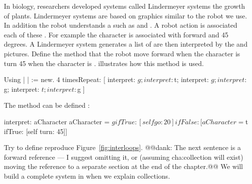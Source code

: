 {In  biology, researchers  developed systems called Lindermeyer systems  the growth of plants. Lindermeyer systems are based on  graphics similar to the robot we use. In addition  the robot understands a   such as  and . A robot action is associated  each of these . For example the character  is associated with  forward\add{,} and   45 degrees. A Lindermeyer system generates a list of  are then interpreted by the  and  pictures. \add{\paragraph
}
Define the method  that  the robot  move forward when the character is  turn 45  when the character is .  illustrates how this method is used.

\begin{scriptwithtitle}{Using }\label{src:interpret}
|  |
 := \Turtle new. 
4 timesRepeat: 
   [   
       interpret: $g;
       interpret: $t;
       interpret: $g; 
       interpret: $g;
       interpret: $t;
       interpret: $g ]
\end{scriptwithtitle}

The method  can be defined :

\begin{method}\label{mth:interpret}
interpret: aCharacter
   aCharacter = $g
      ifTrue: [self go: 20]
      ifFalse: 
         [aCharacter = $t
            ifTrue: [self turn: 45]]
\end{method}

Try to define reproduce  Figure~\ref{fig:interloops}. \add{\paragraph
}
@@dank: The next sentence is a forward reference --- I suggest omitting it, or (assuming cha:collection will exist) moving the reference to a separate section at the end of the chapter.@@
We will build a complete  system in  when we  explain collections. 

}
